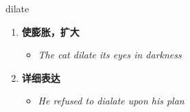 
\begin{frame}
{\huge dilate}
\begin{center}
\begin{enumerate}\Large
  \item \textbf{使膨胀，扩大}
  \begin{itemize}
    \item \em{\Large{The cat dilate its eyes in darkness}}
  \end{itemize}
  \item \textbf{详细表达}
  \begin{itemize}
    \item \em{\Large{He refused to dialate upon his plan}}
  \end{itemize}
\end{enumerate}
\end{center}
\end{frame}
